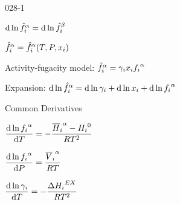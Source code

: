 \begin{mitframe}{028-1}

    
    \begin{listone}

		\item $\mathrm{d}\ln{\hat{\fug}_{\state}}^{\tdiff}=\mathrm{d}\ln{\hat{\fug}_{\state}}^{\texpcoeff}$
    
    	\begin{listtwo}
	
    		\item ${\hat{\fug}_{\state}}^{\tdiff}={\hat{\fug}_{\state}}^{\tdiff}(\Temp, \p, \conjcoor)$
            
            \item Activity-fugacity model: ${\hat{\fug}_{\state}}^{\tdiff}=\actcoeff\conjcoor{\fug_{\state}}^{\tdiff}$
	
		\end{listtwo}
	
    \item Expansion: $\mathrm{d}\ln{\hat{\fug}_{\state}}^{\tdiff}=\mathrm{d}\ln\actcoeff+\mathrm{d}\ln\conjcoor+\mathrm{d}\ln{\fug_{\state}}^{\tdiff}$
    
    	\begin{listtwo}

			\item Common Derivatives
            
            \begin{listthree}
			
            	\item $\dfrac{\mathrm{d}\ln{{\fug}_{\state}}^{\tdiff}}{\mathrm{d}\Temp}=-\dfrac{{\overline{\enthalpy}_{\state}}^{\tdiff}-{\enthalpy_{\state}}^{\init}}{\gasconst\Temp^{2}}$
            
            	\item $\dfrac{\mathrm{d}\ln{{\fug}_{\state}}^{\tdiff}}{\mathrm{d}\p}=\dfrac{{\overline{\vol}_{\state}}^{\tdiff}}{\gasconst\Temp}$
            
            	\item $\dfrac{\mathrm{d}\ln\actcoeff}{\mathrm{d}\Temp}=-\dfrac{\iipf{\enthalpy_{\state}}^{\exfunc}}{\gasconst\Temp^{2}}$
            

\end{listthree}
\end{listtwo}
\end{listone}
\end{mitframe}
